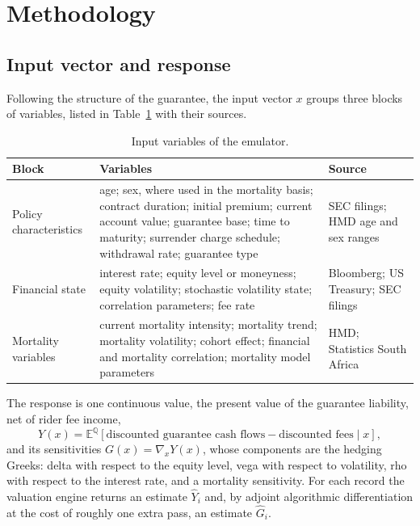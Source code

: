 \documentclass[12pt,a4paper]{article}
\newcommand{\E}{\mathbb{E}}
\newcommand{\Q}{\mathbb{Q}}
\begin{document}
\section{Methodology}
\subsection{Input vector and response}
Following the structure of the guarantee, the input vector $x$ groups three blocks of variables, listed in Table~\ref{tab:inputs} with their sources.

\begin{table}[h]
\centering
\caption{Input variables of the emulator.}
\label{tab:inputs}
\small
\begin{tabular}{@{}p{3cm}p{7.2cm}p{3.6cm}@{}}
\toprule
\textbf{Block} & \textbf{Variables} & \textbf{Source} \\
\midrule
Policy characteristics & age; sex, where used in the mortality basis; contract duration; initial premium; current account value; guarantee base; time to maturity; surrender charge schedule; withdrawal rate; guarantee type & SEC filings; HMD age and sex ranges \\
Financial state & interest rate; equity level or moneyness; equity volatility; stochastic volatility state; correlation parameters; fee rate & Bloomberg; US Treasury; SEC filings \\
Mortality variables & current mortality intensity; mortality trend; mortality volatility; cohort effect; financial and mortality correlation; mortality model parameters & HMD; Statistics South Africa \\
\bottomrule
\end{tabular}
\end{table}

The response is one continuous value, the present value of the guarantee liability, net of rider fee income,
\begin{equation}
Y(x)=\E^{\Q}\!\left[\text{discounted guarantee cash flows} - \text{discounted fees}\mid x\right],
\end{equation}
and its sensitivities $G(x)=\nabla_x Y(x)$, whose components are the hedging Greeks: delta with respect to the equity level, vega with respect to volatility, rho with respect to the interest rate, and a mortality sensitivity. For each record the valuation engine returns an estimate $\widehat Y_i$ and, by adjoint algorithmic differentiation at the cost of roughly one extra pass, an estimate $\widehat G_i$.
\end{document}

